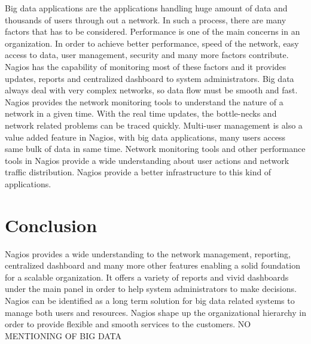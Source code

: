 \documentclass[9pt,twocolumn,twoside]{styles/osajnl}
\begin{document}
Big data applications are the applications handling huge amount of
data and thousands of users through out a network. In such a process,
there are many factors that has to be considered. Performance is
one of the main concerns in an organization. In order to achieve better
performance, speed of the network, easy access to data, user management,
security and many more factors contribute. Nagios has the capability of
monitoring most of these factors and it provides updates, reports and
centralized dashboard to system administrators. Big data always
deal with very complex networks, so data flow must be smooth and fast.
Nagios provides the network monitoring tools to understand the nature
of a network in a given time. With the real time updates, the bottle-necks
and network related problems can be traced quickly. Multi-user management
is also a value added feature in Nagios, with big data applications, many
users access same bulk of data in same time. Network monitoring tools and
other performance tools in Nagios provide a wide understanding about user
actions and network traffic distribution. Nagios provide a better infrastructure
to this kind of applications. 

\section{Conclusion}

Nagios provides a wide understanding to the network management, reporting,
centralized dashboard and many more other features enabling a solid
foundation for a scalable organization. It offers a variety of
reports and vivid dashboards under the main panel in order to help
system administrators to make decisions. Nagios can be identified as a long
term solution for big data related systems to manage both users and resources.
Nagios shape up the organizational hierarchy in order to provide flexible
and smooth services to the customers. NO MENTIONING OF BIG DATA



 
\end{document}
